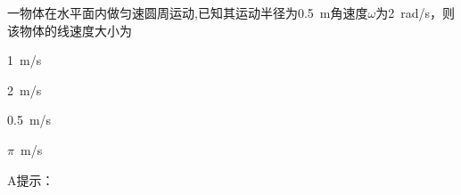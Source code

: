 一物体在水平面内做匀速圆周运动,已知其运动半径为\qty{0.5}{m}角速度\(\omega\)为\qty{2}{rad/s}，则该物体的线速度大小为\paren[]
\begin{choices}
	\item \qty{1}{m/s}
	\item \qty{2}{m/s}
	\item \qty{0.5}{m/s}
	\item \(\pi\)\qty{}{m/s}
\end{choices}
\begin{answer}
	A\qquad 提示：
\end{answer}